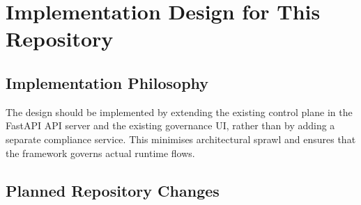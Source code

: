 \documentclass[11pt,a4paper]{article}
\begin{document}
\section{Implementation Design for This Repository}

\subsection{Implementation Philosophy}

The design should be implemented by extending the existing control plane in the FastAPI API server and the existing governance UI, rather than by adding a separate compliance service. This minimises architectural sprawl and ensures that the framework governs actual runtime flows.

\subsection{Planned Repository Changes}
\end{document}
